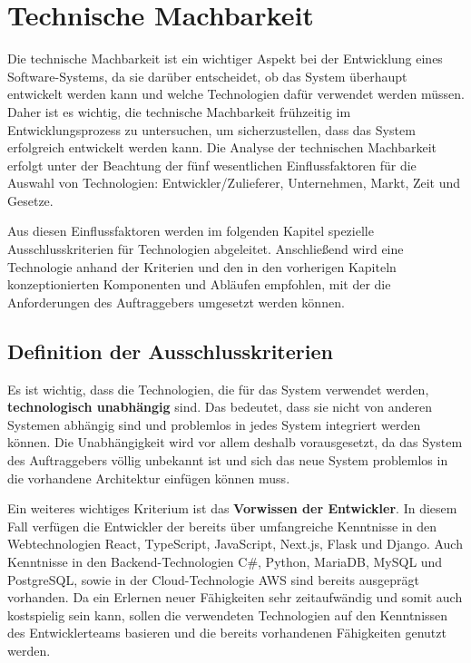 \section{Technische Machbarkeit}

Die technische Machbarkeit ist ein wichtiger Aspekt bei der Entwicklung eines Software-Systems, da sie darüber entscheidet, ob das System überhaupt entwickelt werden kann und welche Technologien dafür verwendet werden müssen. 
Daher ist es wichtig, die technische Machbarkeit frühzeitig im Entwicklungsprozess zu untersuchen, um sicherzustellen, dass das System erfolgreich entwickelt werden kann.
Die Analyse der technischen Machbarkeit erfolgt unter der Beachtung der fünf wesentlichen Einflussfaktoren für die Auswahl von Technologien: Entwickler/Zulieferer, Unternehmen, Markt, Zeit und Gesetze.

Aus diesen Einflussfaktoren werden im folgenden Kapitel spezielle Ausschlusskriterien für Technologien abgeleitet.
Anschließend wird eine Technologie anhand der Kriterien und den in den vorherigen Kapiteln konzeptionierten Komponenten und Abläufen empfohlen, mit der die Anforderungen des Auftraggebers umgesetzt werden können.

\subsection{Definition der Ausschlusskriterien}

Es ist wichtig, dass die Technologien, die für das System verwendet werden, \textbf{technologisch unabhängig} sind. 
Das bedeutet, dass sie nicht von anderen Systemen abhängig sind und problemlos in jedes System integriert werden können. 
Die Unabhängigkeit wird vor allem deshalb vorausgesetzt, da das System des Auftraggebers völlig unbekannt ist und sich das neue System problemlos in die vorhandene Architektur einfügen können muss.

Ein weiteres wichtiges Kriterium ist das \textbf{Vorwissen der Entwickler}. 
In diesem Fall verfügen die Entwickler der \vFKW bereits über umfangreiche Kenntnisse in den Webtechnologien React, TypeScript, JavaScript, Next.js, Flask und Django. 
Auch Kenntnisse in den Backend-Technologien C\#, Python, MariaDB, MySQL und PostgreSQL, sowie in der Cloud-Technologie \ac{AWS} sind bereits ausgeprägt vorhanden. 
Da ein Erlernen neuer Fähigkeiten sehr zeitaufwändig und somit auch kostspielig sein kann, sollen die verwendeten Technologien auf den Kenntnissen des Entwicklerteams basieren und die bereits vorhandenen Fähigkeiten genutzt werden.

